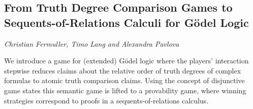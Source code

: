 \documentclass[../booklet.tex]{subfiles}
\begin{document}
\subsection[From Truth Degree Comparison Games to Sequents-of-Relations Calculi for Gödel Logic. {\it Christian Fermuller, Timo Lang and Alexandra Pavlova}]{From Truth Degree Comparison Games to Sequents-of-Relations Calculi for Gödel Logic}
  

\begin{center}
  {\it Christian Fermuller, Timo Lang and Alexandra Pavlova}
\end{center}



We introduce a game for (extended) G\"odel logic where the players'
interaction stepwise reduces claims about the relative order 
of truth degrees of complex formulas to atomic truth comparison claims.
Using the concept of disjunctive game states this semantic game is
lifted to a provability game, where winning strategies correspond to
proofs in a sequents-of-relations calculus.
\end{document}

